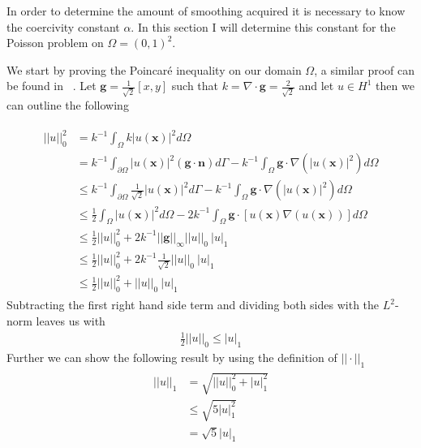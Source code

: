In order to determine the amount of smoothing acquired it is necessary to know the coercivity constant $\alpha$. In this section I will determine this constant for the Poisson problem on $\Omega = (0,1)^2$.

We start by proving the Poincar\'e inequality on our domain $ \Omega $, a similar proof can be found in ~\cite{Quarteroni}. Let $\mathbf{g} = \frac{1}{\sqrt{2}}[x,y]$ such that $k = \nabla \cdot \mathbf{g}=\frac{2}{\sqrt{2}}$ and let $u \in H^1$ then we can outline the following

\begin{align}
	\begin{split}
	||u||_0^2 &= k^{-1}\int_{\Omega}k|u(\mathbf{x})|^2d\Omega \\
	&=  k^{-1}\int_{\partial \Omega}|u(\mathbf{x})|^2(\mathbf{g}\cdot \mathbf{n})d\Gamma 
	-k^{-1}\int_{\Omega}\mathbf{g}\cdot \nabla(|u(\mathbf{x})|^2)d\Omega \\
	&\leq  k^{-1}\int_{\partial \Omega}\frac{1}{\sqrt{2}}|u(\mathbf{x})|^2d\Gamma 
	-k^{-1}\int_{\Omega}\mathbf{g}\cdot \nabla(|u(\mathbf{x})|^2)d\Omega \\
	&\leq \frac{1}{2} \int_{\Omega}|u(\mathbf{x})|^2d\Omega
	-2k^{-1}\int_{\Omega}\mathbf{g}\cdot [u(\mathbf{x})\nabla(u(\mathbf{x}))]d\Omega \\
	&\leq \frac{1}{2}||u||_0^2 + 2k^{-1}||\mathbf{g}||_{\infty}||u||_0 \: |u|_1\\
	&\leq \frac{1}{2}||u||_0^2 + 2k^{-1}\frac{1}{\sqrt{2}}||u||_0 \: |u|_1\\
	&\leq \frac{1}{2}||u||_0^2 + ||u||_0 \: |u|_1
	\end{split}
	\label{eq:PoincareProof}
\end{align}
Subtracting the first right hand side term and dividing both sides with the $L^2$-norm leaves us with
\begin{align}
	\frac{1}{2}||u||_0 \leq |u|_1
	\label{eq:PoincareStatement}
\end{align}
Further we can show the following result by using the definition of $||\cdot||_1$
\begin{align}
	\begin{split}
	||u||_1 &= \sqrt{||u||_0^2+|u|_1^2}\\
	&	\leq \sqrt{5|u|_1^2}\\
	&= \sqrt{5}|u|_1
	\end{split}
	\label{eq:NormInequalitySobolev}
\end{align}

